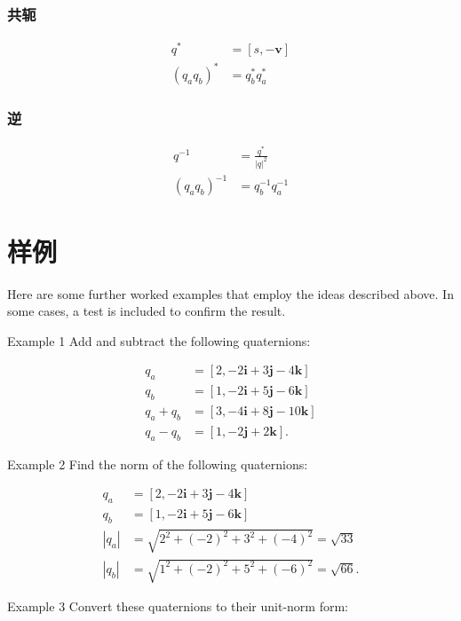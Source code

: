 \subsubsection*{共轭}
$$
\begin{aligned}
q^{*} & =[s,-\mathbf{v}] \\
\left(q_{a} q_{b}\right)^{*} & =q_{b}^{*} q_{a}^{*}
\end{aligned}
$$

\subsubsection*{逆}
$$
\begin{aligned}
q^{-1} & =\frac{q^{*}}{|q|^{2}} \\
\left(q_{a} q_{b}\right)^{-1} & =q_{b}^{-1} q_{a}^{-1}
\end{aligned}
$$

\section{样例}
Here are some further worked examples that employ the ideas described above. In some cases, a test is included to confirm the result.

Example 1 Add and subtract the following quaternions:

$$
\begin{aligned}
q_{a} & =[2,-2 \mathbf{i}+3 \mathbf{j}-4 \mathbf{k}] \\
q_{b} & =[1,-2 \mathbf{i}+5 \mathbf{j}-6 \mathbf{k}] \\
q_{a}+q_{b} & =[3,-4 \mathbf{i}+8 \mathbf{j}-10 \mathbf{k}] \\
q_{a}-q_{b} & =[1,-2 \mathbf{j}+2 \mathbf{k}] .
\end{aligned}
$$

Example 2 Find the norm of the following quaternions:

$$
\begin{aligned}
q_{a} & =[2,-2 \mathbf{i}+3 \mathbf{j}-4 \mathbf{k}] \\
q_{b} & =[1,-2 \mathbf{i}+5 \mathbf{j}-6 \mathbf{k}] \\
\left|q_{a}\right| & =\sqrt{2^{2}+(-2)^{2}+3^{2}+(-4)^{2}}=\sqrt{33} \\
\left|q_{b}\right| & =\sqrt{1^{2}+(-2)^{2}+5^{2}+(-6)^{2}}=\sqrt{66} .
\end{aligned}
$$

Example 3 Convert these quaternions to their unit-norm form:


